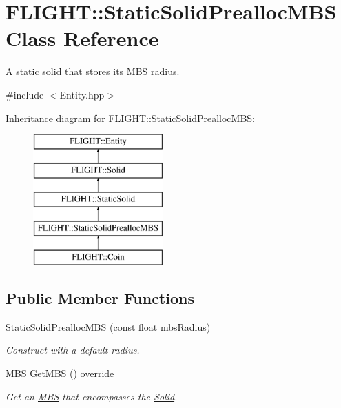 \hypertarget{class_f_l_i_g_h_t_1_1_static_solid_prealloc_m_b_s}{}\section{F\+L\+I\+G\+HT\+:\+:Static\+Solid\+Prealloc\+M\+BS Class Reference}
\label{class_f_l_i_g_h_t_1_1_static_solid_prealloc_m_b_s}


A static solid that stores it\textquotesingle{}s \hyperlink{class_f_l_i_g_h_t_1_1_m_b_s}{M\+BS} radius.  




{\ttfamily \#include $<$Entity.\+hpp$>$}

Inheritance diagram for F\+L\+I\+G\+HT\+:\+:Static\+Solid\+Prealloc\+M\+BS\+:\begin{figure}[H]
\begin{center}
\leavevmode
\includegraphics[height=5.000000cm]{class_f_l_i_g_h_t_1_1_static_solid_prealloc_m_b_s}
\end{center}
\end{figure}
\subsection*{Public Member Functions}
\begin{DoxyCompactItemize}
\item 
\hyperlink{class_f_l_i_g_h_t_1_1_static_solid_prealloc_m_b_s_ad03a8b9c11e12370d3e21778803fed6e}{Static\+Solid\+Prealloc\+M\+BS} (const float mbs\+Radius)
\begin{DoxyCompactList}\small\item\em Construct with a default radius. \end{DoxyCompactList}\item 
\hyperlink{class_f_l_i_g_h_t_1_1_m_b_s}{M\+BS} \hyperlink{class_f_l_i_g_h_t_1_1_static_solid_prealloc_m_b_s_a3598b87e0be4695f62f526d74e99dc33}{Get\+M\+BS} () override
\begin{DoxyCompactList}\small\item\em Get an \hyperlink{class_f_l_i_g_h_t_1_1_m_b_s}{M\+BS} that encompasses the \hyperlink{class_f_l_i_g_h_t_1_1_solid}{Solid}. \end{DoxyCompactList}\end{DoxyCompactItemize}


